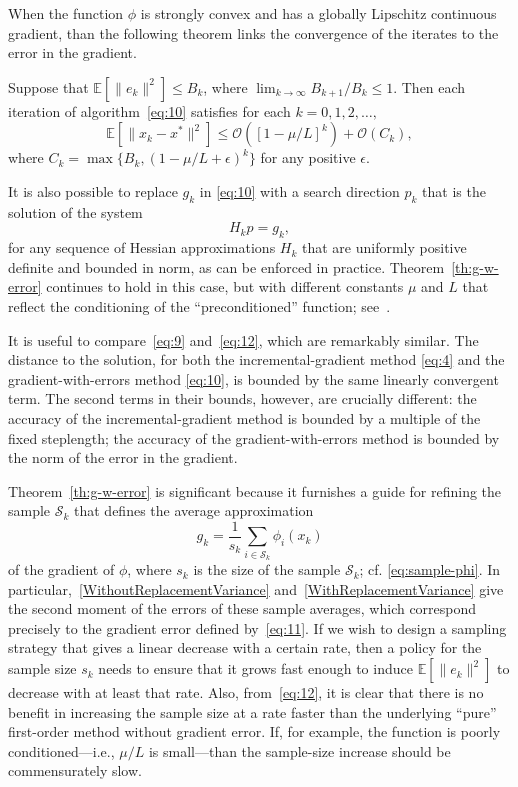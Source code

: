 \documentclass[nospthms]{svjour3}
\numberwithin{equation}{section}
\def\norm#1{\|#1\|}
\def\k{_k}
\def\kp#1{_{k+#1}}
\def\xstar{x^*}
\def\Oscr{\mathcal{O}}
\def\Sscr{\mathcal{S}}
\def\expval{\mathbb{E}}
\def\sample{\Sscr}
\begin{document}
When the function $\phi$ is strongly convex and has a globally
Lipschitz continuous gradient, than the following theorem links the
convergence of the iterates to the error in the gradient.
\begin{btheorem} \label{th:g-w-error}
  Suppose that $\expval[\norm{e\k}^2] \le B\k$, where $\lim_{k\to\infty}
  B\kp1/B\k\le 1$. Then each iteration of algorithm~\eqref{eq:10}
  satisfies for each $k=0,1,2,\ldots,$
  \begin{equation}
    \label{eq:12}
    \expval[\norm{x\k-\xstar}^2] \le \Oscr([1-\mu/L]^k) + \Oscr(C\k),
  \end{equation}
  where $C\k = \max\{B\k,(1-\mu/L+\epsilon)^k\}$ for any positive $\epsilon$.
\end{btheorem}

It is also possible to replace $g\k$ in \eqref{eq:10} with a search
direction $p\k$ that is the solution of the system
\begin{equation}
  \label{eq:16}
  H\k p=g\k,
\end{equation}
for any sequence of Hessian approximations $H\k$ that are uniformly
positive definite and bounded in norm, as can be enforced in practice.
Theorem~\ref{th:g-w-error} continues to hold in this case, but with
different constants $\mu$ and $L$ that reflect the conditioning of the
``preconditioned'' function; see~\cite[\S1.2]{FS:2011}.

It is useful to compare~\eqref{eq:9} and~\eqref{eq:12}, which are
remarkably similar. The distance to the solution, for both the
incremental-gradient method \eqref{eq:4} and the gradient-with-errors
method \eqref{eq:10}, is bounded by the same linearly convergent
term. The second terms in their bounds, however, are crucially
different: the accuracy of the incremental-gradient method is bounded
by a multiple of the fixed steplength; the accuracy of the
gradient-with-errors method is bounded by the norm of the error in the
gradient.

Theorem~\ref{th:g-w-error} is significant because it furnishes a guide
for refining the sample $\sample\k$ that defines the average
approximation
\[
 g\k = \frac1{s\k}\sum_{i\in\sample\k}\phi_i(x\k)
\]
of the gradient of $\phi$, where $s\k$ is the size of the sample
$\sample\k$; cf. \eqref{eq:sample-phi}. In
particular,~\eqref{WithoutReplacementVariance}
and~\eqref{WithReplacementVariance} give the second moment of the
errors of these sample averages, which correspond precisely to the
gradient error defined by~\eqref{eq:11}.  If we wish to design a
sampling strategy that gives a linear decrease with a certain rate,
then a policy for the sample size $s\k$ needs to ensure that it grows
fast enough to induce $\expval[\norm{e\k}^2]$ to decrease with at
least that rate. Also, from~\eqref{eq:12}, it is clear that there is
no benefit in increasing the sample size at a rate faster than the
underlying ``pure'' first-order method without gradient error. If, for
example, the function is poorly conditioned---i.e., $\mu/L$ is
small---than the sample-size increase should be commensurately slow.
\end{document}

